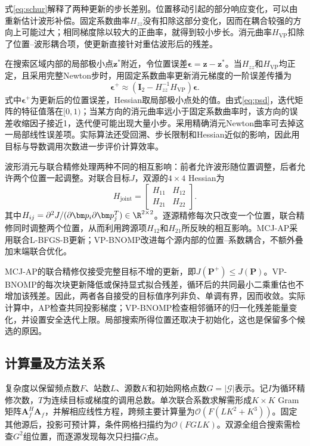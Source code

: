 式\eqref{eq:schur}解释了两种更新的步长差别。位置移动引起的部分响应变化，可以由重新估计波形补偿。固定系数曲率$H_{zz}$没有扣除这部分变化，因而在耦合较强的方向上可能过大；相同梯度除以较大的正曲率，就得到较小步长。消元曲率$H_{\mathrm{VP}}$扣除了位置--波形耦合项，使更新直接针对重估波形后的残差。

在搜索区域内部的局部极小点$\bm z^*$附近，令位置误差$\bm\epsilon=\bm z-\bm z^*$。当$H_{zz}$和$H_{\mathrm{VP}}$均正定，且采用完整Newton步时，用固定系数曲率更新消元梯度的一阶误差传播为
\begin{equation}
 \bm\epsilon^{+}\approx
 \left(\bm I_2-H_{zz}^{-1}H_{\mathrm{VP}}\right)\bm\epsilon .\label{eq:localrate}
\end{equation}
式中$\bm\epsilon^+$为更新后的位置误差，Hessian取局部极小点处的值。由式\eqref{eq:psd}，迭代矩阵的特征值落在$[0,1)$；当某方向的消元曲率远小于固定系数曲率时，该方向的误差收缩因子接近1，迭代便可能出现大量小步。采用精确消元Newton曲率可去掉这一局部线性误差项。实际算法还受回溯、步长限制和Hessian近似的影响，因此用目标与导数调用次数进一步评价计算效率。

波形消元与联合精修处理两种不同的相互影响：前者允许波形随位置调整，后者允许两个位置一起调整。对联合目标$J$，双源的$4\times4$ Hessian为
\begin{equation}
 H_{\mathrm{joint}}=
 \begin{bmatrix}H_{11}&H_{12}\\H_{21}&H_{22}\end{bmatrix} .
\end{equation}
其中$H_{ij}=\partial^2J/(\partial\bm p_i\partial\bm p_j^T)\in\R^{2\times2}$。逐源精修每次只改变一个位置，联合精修同时调整两个位置，从而利用跨源项$H_{12}$和$H_{21}$所反映的相互影响。MCJ-AP采用联合L-BFGS-B更新；VP-BNOMP改进每个源内部的位置--系数耦合，不额外叠加末端联合优化。

MCJ-AP的联合精修仅接受完整目标不增的更新，即$J(\bm P^+)\le J(\bm P)$。VP-BNOMP的每次块更新降低或保持显式拟合残差，循环后的共同最小二乘重估也不增加该残差。因此，两者各自接受的目标值序列非负、单调有界，因而收敛。实际计算中，AP检查共同投影梯度；VP-BNOMP检查相邻循环的归一化残差能量变化，并设置安全迭代上限。局部搜索所得位置还取决于初始化，这也是保留多个候选的原因。

\subsection{计算量及方法关系}\label{sec:complexity}
复杂度以保留频点数$F$、站数$L$、源数$K$和初始网格点数$G=|\mathcal G|$表示。记$I$为循环精修次数，$T$为连续目标或梯度的调用总数。单次联合系数求解需形成$K\times K$ Gram矩阵$\bm A_f^H\bm A_f$，并解相应线性方程，跨频主要计算量为$\mathcal O(F(LK^2+K^3))$。固定其他源后，投影可预计算，条件网格扫描约为$\mathcal O(FGLK)$。双源全组合搜索需检查$G^2$组位置，而逐源发现每次只扫描$G$点。

